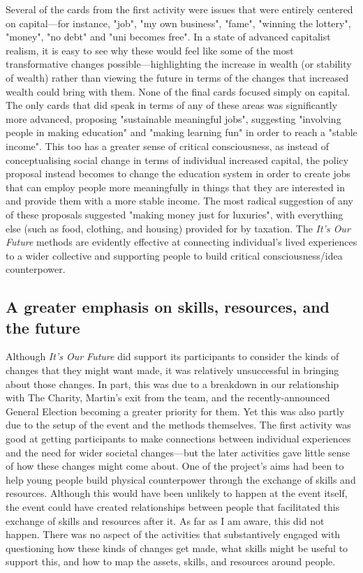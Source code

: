 Several of the cards from the first activity were issues that were entirely centered on capital—for instance, "job", "my own business", "fame", "winning the lottery", "money", "no debt" and "uni becomes free". In a state of advanced capitalist realism, it is easy to see why these would feel like some of the most transformative changes possible—highlighting the increase in wealth (or stability of wealth) rather than viewing the future in terms of the changes that increased wealth could bring with them. None of the final cards focused simply on capital. The only cards that did speak in terms of any of these areas was significantly more advanced, proposing "sustainable meaningful jobs", suggesting "involving people in making education" and "making learning fun" in order to reach a "stable income". This too has a greater sense of critical consciousness, as instead of conceptualising social change in terms of individual increased capital, the policy proposal instead becomes to change the education system in order to create jobs that can employ people more meaningfully in things that they are interested in and provide them with a more stable income. The most radical suggestion of any of these proposals suggested "making money just for luxuries", with everything else (such as food, clothing, and housing) provided for by taxation. The \textit{It's Our Future} methods are evidently effective at connecting individual's lived experiences to a wider collective and supporting people to build critical consciousness/idea counterpower. 

\subsection{A greater emphasis on skills, resources, and the future}
Although \textit{It's Our Future} did support its participants to consider the kinds of changes that they might want made, it was relatively unsuccessful in bringing about those changes. In part, this was due to a breakdown in our relationship with The Charity, Martin's exit from the team, and the recently-announced General Election becoming a greater priority for them. Yet this was also partly due to the setup of the event and the methods themselves. The first activity was good at getting participants to make connections between individual experiences and the need for wider societal changes—but the later activities gave little sense of how these changes might come about. One of the project's aims had been to help young people build physical counterpower through the exchange of skills and resources. Although this would have been unlikely to happen at the event itself, the event could have created relationships between people that facilitated this exchange of skills and resources after it. As far as I am aware, this did not happen. There was no aspect of the activities that substantively engaged with questioning how these kinds of changes get made, what skills might be useful to support this, and how to map the assets, skills, and resources around people. 

